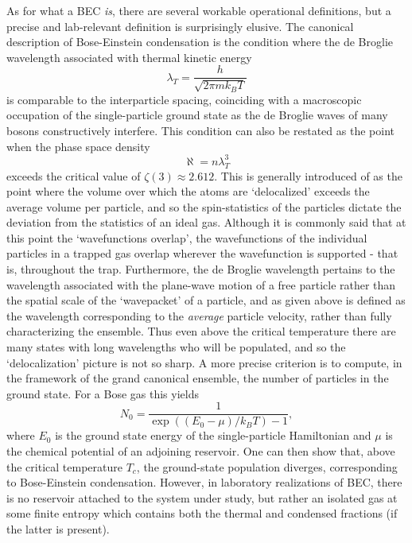 	As for what a BEC \emph{is}, there are several workable operational definitions, but a precise and lab-relevant definition is surprisingly elusive.
	The canonical description of Bose-Einstein condensation is the condition where the de Broglie wavelength associated with thermal kinetic energy
	\begin{equation}
		\lambda_T = \frac{h}{\sqrt{2\pi m k_B T}}
	\end{equation}
	is comparable to the interparticle spacing, coinciding with a macroscopic occupation of the single-particle ground state as the de Broglie waves of many bosons constructively interfere.
	This condition can also be restated as the point when the phase space density
	\begin{equation}
		\aleph = n \lambda_T^3
	\end{equation}
	exceeds the critical value of $\zeta(3)\approx2.612$. 
	This is generally introduced of as the point where the volume over which the atoms are `delocalized'  exceeds the average volume per particle, and so the spin-statistics of the particles dictate the deviation from the statistics of an ideal gas.
	Although it is commonly said that at this point the `wavefunctions overlap', the wavefunctions of the individual particles in a trapped gas overlap wherever the wavefunction is supported - that is, throughout the trap.
	Furthermore, the de Broglie wavelength pertains to the wavelength associated with the plane-wave motion of a free particle rather than the spatial scale of the `wavepacket' of a particle, and as given above is defined as the wavelength corresponding to the \emph{average} particle velocity, rather than fully characterizing the ensemble. 
	Thus even above the critical temperature there are many states with long wavelengths who will be populated, and so the `delocalization' picture is not so sharp.
	A more precise criterion is to compute, in the framework of the grand canonical ensemble, the number of particles in the ground state. For a Bose gas this yields
	\begin{equation}
		N_0 = \frac{1}{\exp((E_0-\mu)/k_B T)-1},
	\end{equation}
	where $E_0$ is the ground state energy of the single-particle Hamiltonian and $\mu$ is the chemical potential of an adjoining reservoir. 
	One can then show that, above the critical temperature $T_c$, the ground-state population diverges, corresponding to Bose-Einstein condensation.
	However, in laboratory realizations of BEC, there is no reservoir attached to the system under study, but rather an isolated gas at some finite entropy which contains both the thermal and condensed fractions (if the latter is present). 
	
